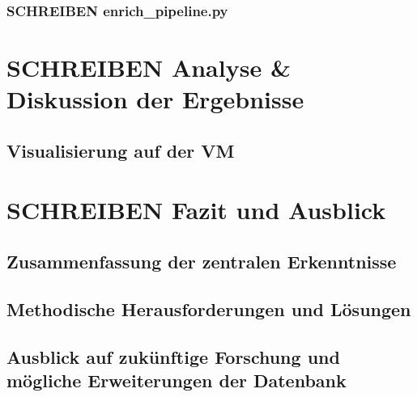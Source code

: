 \documentclass[12pt, a4paper, ngerman, bidi=default]{article}
\begin{document}
\subsubsection{SCHREIBEN enrich\_pipeline.py}


\section{SCHREIBEN Analyse \& Diskussion der Ergebnisse}
\subsection{Visualisierung auf der VM}


\section{SCHREIBEN Fazit und Ausblick}
\subsection{Zusammenfassung der zentralen Erkenntnisse}
\subsection{Methodische Herausforderungen und Lösungen}
\subsection{Ausblick auf zukünftige Forschung und mögliche Erweiterungen der Datenbank}
\newpage

\pagecolor{white}
\newpage
\begingroup
\small
\singlespacing%
\end{document}
